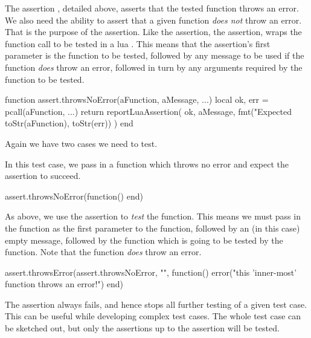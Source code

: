 
The assertion , detailed above, asserts that the 
tested function throws an error. We also need the ability to assert that a 
given function \emph{does not} throw an error. That is the purpose of the 
 assertion. Like the  
assertion, the  assertion, wraps the function 
call to be tested in a lua . This means that the 
 assertion's first parameter is the function to 
be tested, followed by any message to be used if the function \emph{does} 
throw an error, followed in turn by any arguments required by the function 
to be tested. 

\startLuaCode
function assert.throwsNoError(aFunction, aMessage, ...)
  local ok, err = pcall(aFunction, ...)
  return reportLuaAssertion(
    ok,
    aMessage,
    fmt("Expected %
      toStr(aFunction), toStr(err))
  )
end
\stopLuaCode

Again we have two cases we need to test.


In this test case, we pass in a function which throws no error and expect 
the assertion to succeed. 

\startLuaTest
  assert.throwsNoError(function() end)
\stopLuaTest
\stopTestCase


As above, we use the  assertion to \emph{test} 
the  function. This means we must pass in the 
 function as the first parameter to the 
  function, followed by an (in this 
case) empty message, followed by the function which is going to be tested 
by the  function. Note that the 
 function \emph{does} throw an error. 

\startLuaTest
  assert.throwsError(assert.throwsNoError, "", function()
    error("this 'inner-most' function throws an error!")
  end)
\stopLuaTest
\stopTestCase

\stopTestSuite


The  assertion always fails, and hence stops all further 
testing of a given test case. This can be useful while developing complex 
test cases. The whole test case can be sketched out, but only the 
assertions up to the  assertion will be tested. 

